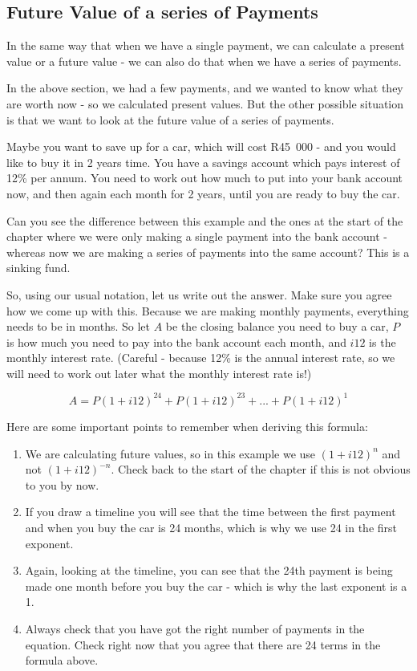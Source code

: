 \subsection{Future Value of a series of Payments}
In the same way that when we have a single payment, we can calculate a present value or a future value - we can also do that when we have a series of payments.

In the above section, we had a few payments, and we wanted to know what they are worth now - so we calculated present values. But the other possible situation is that we want to look at the future value of a series of payments.

Maybe you want to save up for a car, which will cost R45~000 - and you would like to buy it in 2 years time. You have a savings account which pays interest of 12\% per annum. You need to work out how much to put into your bank account now, and then again each month for 2 years, until you are ready to buy the car.

Can you see the difference between this example and the ones at the start of the chapter where we were only making a single payment into the bank account - whereas now we are making a series of payments into the same account? This is a sinking fund.

So, using our usual notation, let us write out the answer. Make sure you agree how we come up with this. Because we are making monthly payments, everything needs to be in months. So let $A$ be the closing balance you need to buy a car, $P$ is how much you need to pay into the bank account each month, and $i12$ is the monthly interest rate. (Careful - because 12\% is the annual interest rate, so we will need to work out later what the monthly interest rate is!)

\begin{equation*}
A = P(1+i12)^{24} + P(1+i12)^{23} + ... + P(1+i12)^1
\end{equation*}

Here are some important points to remember when deriving this formula:
\begin{enumerate}
\item{We are calculating future values, so in this example we use $(1+i12)^n$ and not $(1+i12)^{-n}$. Check back to the start of the chapter if this is not obvious to you by now.}
\item{If you draw a timeline you will see that the time between the first payment and when you buy the car is 24 months, which is why we use 24 in the first exponent.}
\item{Again, looking at the timeline, you can see that the 24th payment is being made one month before you buy the car - which is why the last exponent is a 1.}
\item{Always check that you have got the right number of payments in the equation. Check right now that you agree that there are 24 terms in the formula above.}
\end{enumerate}

